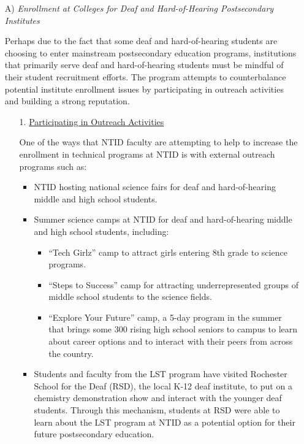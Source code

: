 \documentclass[11.5pt]{sig-alternate} %
\begin{document}
\begin{large}
\begin{itemize}
    \item[A)] \textit{Enrollment at Colleges for Deaf and Hard-of-Hearing Postsecondary Institutes}
    \begin{sloppypar}Perhaps due to the fact that some deaf and hard-of-hearing students are choosing to enter mainstream postsecondary education programs, institutions that primarily serve deaf and hard-of-hearing students must be mindful of their student recruitment efforts. The program attempts to counterbalance potential institute enrollment issues by participating in outreach activities and building a strong reputation.\end{sloppypar}
    \begin{enumerate}
        \item[1.] \underline{Participating in Outreach Activities}
        \begin{sloppypar}One of the ways that NTID faculty are attempting to help to increase the enrollment in technical programs at NTID is with external outreach programs such as:\end{sloppypar}
        \begin{itemize}
            \item NTID hosting national science fairs for deaf and hard-of-hearing middle and high school students.
            \item Summer science camps at NTID for deaf and hard-of-hearing middle and high school students, including:
            \begin{itemize}
                \item “Tech Girlz” camp to attract girls entering 8th grade to science programs.
                \item “Steps to Success” camp for attracting underrepresented groups of middle school students to the science fields.
                \item “Explore Your Future” camp, a 5-day program in the summer that brings some 300 rising high school seniors to campus to learn about career options and to interact with their peers from across the country.
            \end{itemize}
            \item Students and faculty from the LST program have visited Rochester Sch\-ool for the Deaf (RSD), the local K-12 deaf institute, to put on a chemistry demonstration show and interact with the younger deaf students. Through this mechanism, students at RSD were able to learn about the LST program at NTID as a potential option for their future postsecondary education.

\end{itemize}
\end{enumerate}
\end{itemize}
\end{large}
\end{document}

